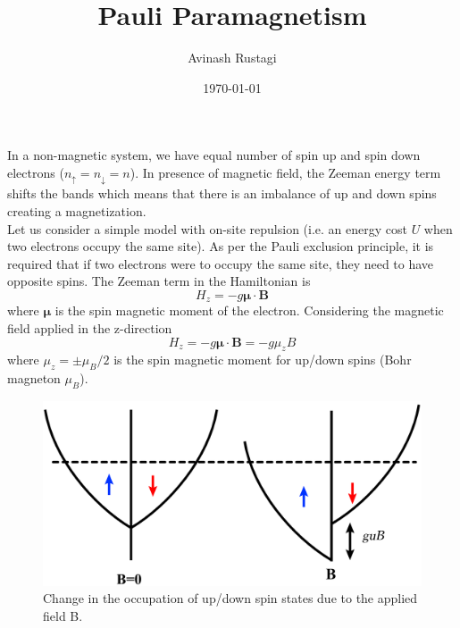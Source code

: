 \documentclass[aps,prb,onecolumn,notitlepage,showpacs,floatfix,superscriptaddress]{revtex4-1}
\begin{document}
\title{Pauli Paramagnetism}

\author{Avinash Rustagi}
%
\date{\today}

\maketitle
%
In a non-magnetic system, we have equal number of spin up and spin down electrons ($n_{\uparrow}=n_{\downarrow}=n$). In presence of magnetic field, the Zeeman energy term shifts the bands which means that there is an imbalance of up and down spins creating a magnetization.\\

Let us consider a simple model with on-site repulsion (i.e. an energy cost $U$ when two electrons occupy the same site). As per the Pauli exclusion principle, it is required that if two electrons were to occupy the same site, they need to have opposite spins. The Zeeman term in the Hamiltonian is
\begin{equation}
H_{z}= -g {\bm \mu}\cdot{\bm B}
\end{equation}
where ${\bm \mu}$ is the spin magnetic moment of the electron. Considering the magnetic field applied in the z-direction
\begin{equation}
H_{z}= - g {\bm \mu}\cdot{\bm B} = -g \mu_z  B 
\end{equation}
where $\mu_z=\pm \mu_B /2$ is the spin magnetic moment for up/down spins (Bohr magneton $\mu_B$).
\begin{figure}[hbtp]
\centering
\includegraphics[scale=0.075]{PauliChi.png}
\caption{Change in the occupation of up/down spin states due to the applied field B.}
\end{figure}
\end{document}
